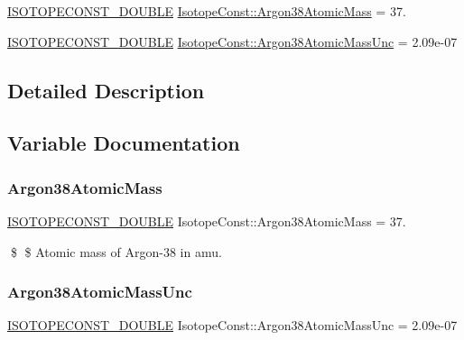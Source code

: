 \begin{DoxyCompactItemize}
\item 
\mbox{\hyperlink{group___isotope_const-_macros_ga8f45a7272ce02c0b4c65c44636ed719a}{I\+S\+O\+T\+O\+P\+E\+C\+O\+N\+S\+T\+\_\+\+D\+O\+U\+B\+LE}} \mbox{\hyperlink{group___isotope_const-_argon-_ar38_gaf9b459fbb2ce9ab93d23385cb3ac2556}{Isotope\+Const\+::\+Argon38\+Atomic\+Mass}} = 37.
\item 
\mbox{\hyperlink{group___isotope_const-_macros_ga8f45a7272ce02c0b4c65c44636ed719a}{I\+S\+O\+T\+O\+P\+E\+C\+O\+N\+S\+T\+\_\+\+D\+O\+U\+B\+LE}} \mbox{\hyperlink{group___isotope_const-_argon-_ar38_gab6ed5330d98ab971699cae275aef672e}{Isotope\+Const\+::\+Argon38\+Atomic\+Mass\+Unc}} = 2.\+09e-\/07
\end{DoxyCompactItemize}


\subsection{Detailed Description}


\subsection{Variable Documentation}
\mbox{\label{group___isotope_const-_argon-_ar38_gaf9b459fbb2ce9ab93d23385cb3ac2556}} 
\subsubsection{\texorpdfstring{Argon38\+Atomic\+Mass}{Argon38AtomicMass}}
{\footnotesize\ttfamily \mbox{\hyperlink{group___isotope_const-_macros_ga8f45a7272ce02c0b4c65c44636ed719a}{I\+S\+O\+T\+O\+P\+E\+C\+O\+N\+S\+T\+\_\+\+D\+O\+U\+B\+LE}} Isotope\+Const\+::\+Argon38\+Atomic\+Mass = 37.}

\$ \$ Atomic mass of Argon-\/38 in amu. \mbox{\label{group___isotope_const-_argon-_ar38_gab6ed5330d98ab971699cae275aef672e}} 
\subsubsection{\texorpdfstring{Argon38\+Atomic\+Mass\+Unc}{Argon38AtomicMassUnc}}
{\footnotesize\ttfamily \mbox{\hyperlink{group___isotope_const-_macros_ga8f45a7272ce02c0b4c65c44636ed719a}{I\+S\+O\+T\+O\+P\+E\+C\+O\+N\+S\+T\+\_\+\+D\+O\+U\+B\+LE}} Isotope\+Const\+::\+Argon38\+Atomic\+Mass\+Unc = 2.\+09e-\/07}

